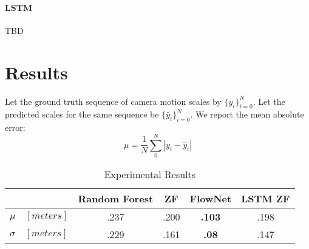 \paragraph{LSTM} TBD

\section{Results}

Let the ground truth sequence of camera motion scales by
$\{y_i\}_{i=0}^N$.  Let the predicted scales for the same sequence be
$\{\hat{y}_i\}_{i=0}^N$.  We report the mean absolute error:
\[
  \mu = \frac{1}{N}\sum_0^N{|y_i - \hat{y}_i|}
\]

\begin{table}[ht]
  \centering
  \begin{tabular}{ lcccc }
    \hline
                        & Random Forest & ZF   & FlowNet & LSTM ZF \\
    \hline
    $\mu\quad[meters]$        & .237          & .200 & \textbf{.103}    & .198 \\
    $\sigma\quad[meters]$     & .229          & .161 & \textbf{.08}     & .147 \\    
    \hline
  \end{tabular}
  \caption{Experimental Results}
  \label{table:1}
\end{table}


